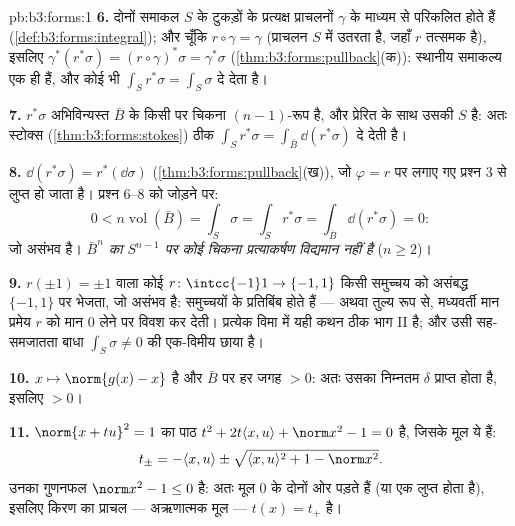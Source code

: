 \begin{solution}{pb:b3:forms:1}
\textbf{6.} दोनों समाकल $S$ के टुकड़ों के प्रत्यक्ष प्राचलनों
$\gamma$ के माध्यम से परिकलित होते हैं
(\cref{def:b3:forms:integral}); और चूँकि $r\circ\gamma =
\gamma$ (प्राचलन $S$ में उतरता है, जहाँ $r$ तत्समक है),
इसलिए $\gamma^*(r^*\sigma) = (r\circ\gamma)^*\sigma =
\gamma^*\sigma$ (\cref{thm:b3:forms:pullback}(क)): स्थानीय
समाकल्य एक ही हैं, और कोई भी 
$\int_Sr^*\sigma = \int_S\sigma$ दे देता है।

\textbf{7.} $r^*\sigma$  अभिविन्यस्त $\bar B$ के किसी
 पर चिकना $(n-1)$-रूप है, और प्रेरित  के
साथ उसकी  $S$ है: अतः स्टोक्स
(\cref{thm:b3:forms:stokes}) ठीक
$\int_Sr^*\sigma = \int_{\bar B}\dd(r^*\sigma)$ दे देती है।

\textbf{8.} $\dd(r^*\sigma) = r^*(\dd\sigma)$
(\cref{thm:b3:forms:pullback}(ख)), जो $\varphi = r$ पर लगाए
गए प्रश्न 3 से लुप्त हो जाता है। प्रश्न 6--8 को जोड़ने पर:
\[
0 < n\operatorname{vol}(\bar B) = \int_S\sigma =
\int_Sr^*\sigma = \int_{\bar B}\dd(r^*\sigma) = 0 :
\]
जो असंभव है। \emph{$\bar B^n$ का $S^{n-1}$ पर कोई चिकना
प्रत्याकर्षण विद्यमान नहीं है} ($n \geq 2$)।

\textbf{9.} $r(\pm1) = \pm1$ वाला कोई 
$r\colon\intcc{-1}1\to\{-1,1\}$ किसी  समुच्चय को
असंबद्ध $\{-1, 1\}$ पर भेजता, जो असंभव है:  समुच्चयों
के  प्रतिबिंब  होते हैं --- अथवा तुल्य रूप से,
मध्यवर्ती मान प्रमेय $r$ को मान $0$ लेने पर विवश कर देती।
प्रत्येक विमा में यही कथन ठीक भाग II है; और  उसी
सह-समजातता बाधा $\int_S\sigma \neq 0$ की एक-विमीय छाया है।

\textbf{10.} $x \mapsto \norm{g(x) - x}$  है और 
$\bar B$ पर हर जगह $> 0$: अतः उसका निम्नतम $\delta$ प्राप्त
होता है, इसलिए $> 0$।

\textbf{11.} $\norm{x + tu}^2 = 1$ का पाठ $t^2 + 2t\langle x,
u\rangle + \norm x^2 - 1 = 0$ है, जिसके मूल ये हैं:
\[
t_\pm = -\langle x, u\rangle \pm \sqrt{\langle x,
u\rangle^2 + 1 - \norm x^2} .
\]
उनका गुणनफल $\norm x^2 - 1 \leq 0$ है: अतः मूल $0$ के
दोनों ओर पड़ते हैं (या एक लुप्त होता है), इसलिए किरण का
प्राचल --- अऋणात्मक मूल --- $t(x) = t_+$ है।


\end{solution}
